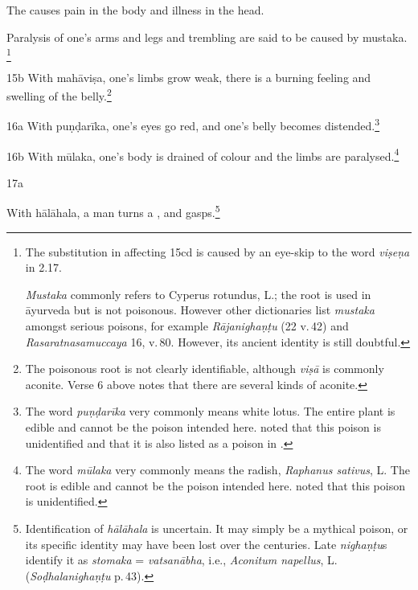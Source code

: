 \begin{translation}
The  causes pain in
the body and illness in the head. 

Paralysis of one's arms and legs and trembling are said to be
caused by \gls{mustaka}.%
\footnote{The substitution in  affecting 15cd is
    caused by an eye-skip to the word \emph{viṣeṇa} in 2.17. 
    
    \emph{Mustaka} commonly refers to Cyperus rotundus, L.; the root is
    used in āyurveda but is not poisonous.  However other dictionaries
    list \emph{mustaka} amongst serious poisons, for example
    \emph{Rājanighaṇṭu} (22 v.\,42) and \emph{Rasaratnasamuccaya} 16,
    v.\,80.  However, its ancient identity is still doubtful.} 

\item[15b] 
With \gls{mahāviṣa}, one's limbs grow weak, there is a burning feeling
and swelling of the belly.\footnote{The poisonous root 
    is not clearly identifiable, although \emph{viṣā} is commonly aconite.
    Verse 6 above notes that there are several kinds of aconite.}
        
\item[16a] With \gls{puṇḍarīka},  
        one's eyes go red, and one's belly becomes
        distended.\footnote{The word \emph{puṇḍarīka} very commonly means
            white lotus. The entire plant is
            edible and cannot be the poison intended here. \citet[252]{gvdb}
            noted that this poison is unidentified and that it is also listed
            as a poison in .}

\item[16b] With \gls{mūlaka},    
            one's body is drained of colour and the limbs are
            paralysed.\footnote{The word \emph{mūlaka} very commonly means
                the radish, \emph{Raphanus sativus}, L. The root is edible and
                cannot be the poison intended here. \citet[317]{gvdb} noted that
                this poison is unidentified.}
    
    \item[17a]
        
    With \gls{hālāhala}, a man turns a , and
gasps.\footnote{Identification of \emph{hālāhala} is  uncertain. It may simply
be a mythical poison, or its specific identity may have been lost over the
centuries. Late \emph{nighaṇṭu}s identify it as \emph{stomaka} =
\emph{vatsanābha}, i.e., \emph{Aconitum napellus}, L. 
(\emph{Soḍhalanighaṇṭu} p.\,43). 

}
\end{translation}
